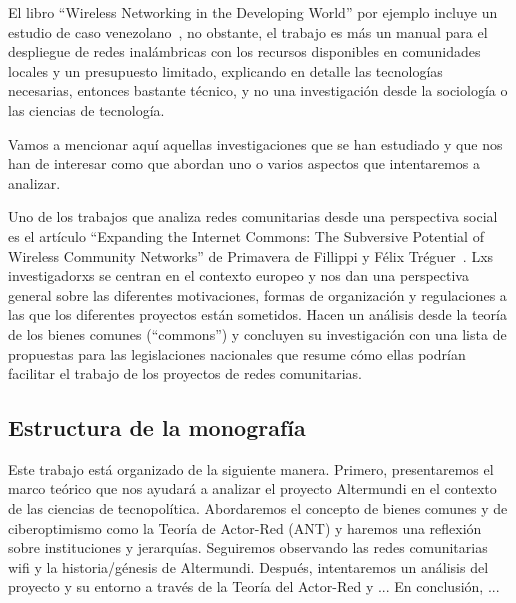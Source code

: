 El libro ``Wireless Networking in the Developing World'' por ejemplo incluye un estudio de caso venezolano~\autocite[437-452]{WNDW2013}, no obstante, el trabajo es más un manual para el despliegue de redes inalámbricas con los recursos disponibles en comunidades locales y un presupuesto limitado, explicando en detalle las tecnologías necesarias, entonces bastante técnico, y no una investigación desde la sociología o las ciencias de tecnología.

Vamos a mencionar aquí aquellas investigaciones que se han estudiado y que nos han de interesar como que abordan uno o varios aspectos que intentaremos a analizar.

Uno de los trabajos que analiza redes comunitarias desde una perspectiva social es el artículo ``Expanding the Internet Commons: The Subversive Potential of Wireless Community Networks'' de Primavera de Fillippi y Félix Tréguer~\autocite{FiTre2015}.
Lxs investigadorxs se centran en el contexto europeo y nos dan una perspectiva general sobre las diferentes motivaciones, formas de organización y regulaciones a las que los diferentes proyectos están sometidos.
Hacen un análisis desde la teoría de los bienes comunes (``commons'') y concluyen su investigación con una lista de propuestas para las legislaciones nacionales que resume cómo ellas podrían facilitar el trabajo de los proyectos de redes comunitarias.

\subsection{Estructura de la monografía}

Este trabajo está organizado de la siguiente manera.
Primero, presentaremos el marco teórico que nos ayudará a analizar el proyecto Altermundi en el contexto de las ciencias de tecnopolítica.
Abordaremos el concepto de bienes comunes y de ciberoptimismo como la Teoría de Actor-Red (ANT) y haremos una reflexión sobre instituciones y jerarquías.
Seguiremos observando las redes comunitarias wifi y la historia/génesis de Altermundi.
Después, intentaremos un análisis del proyecto y su entorno a través de la Teoría del Actor-Red y ...
En conclusión, ...

